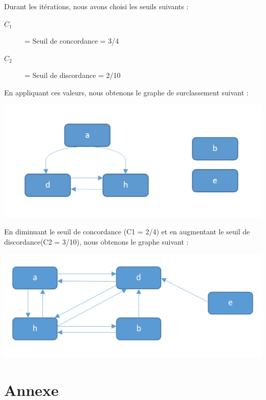 \documentclass[12pt]{article}
\begin{document}
Durant les itérations, nous avons choisi les seuils suivants :
\begin{description}
\item[$C_{1}$] = Seuil de concordance = 3/4
\item[$C_{2}$] = Seuil de discordance = 2/10
\end{description}
En appliquant ces valeurs, nous obtenons le graphe de surclassement suivant : 
\begin{center}
\includegraphics[scale=1.5]{graphes/s_3sur4____v_2sur10}
\end{center}

En diminuant le seuil de concordance (C1 = 2/4) et en augmentant le seuil de discordance(C2 = 3/10), nous obtenons le graphe suivant : 
\begin{center}
\includegraphics[scale=1]{graphes/s_2sur4____v_3sur10}
\end{center}
\newpage
\section*{Annexe}

\end{document}

